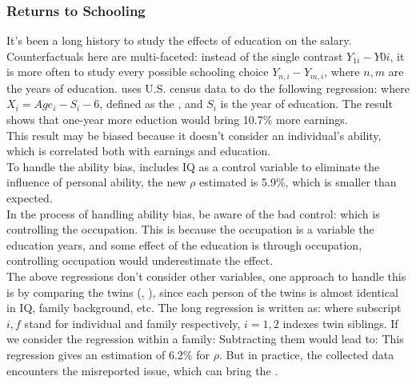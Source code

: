 \documentclass[12pt]{report}
\begin{document}
\subsubsection{Returns to Schooling}
It's been a long history to study the effects of education on the salary. Counterfactuals here are multi-faceted: instead of the
single contrast $Y_{1i}-Y{0i}$, it is more often to study every possible schooling choice $Y_{n,i}-Y_{m,i}$, where $n,m$ are the
years of education.
\cite{mincer1974schooling} uses U.S. census data to do the following regression:
where $X_i=Age_i-S_i-6$, defined as the , and $S_i$ is the year of education. The result shows that one-year more eduction would bring 10.7\% more earnings.\\
This result may be biased because it doesn't consider an individual's ability, which is correlated both with earnings and education.\\
To handle the ability bias, \cite{griliches1977estimating} includes IQ as a control variable to eliminate the influence of personal
ability, the new $\rho$ estimated is 5.9\%, which is smaller than expected.\\
In the process of handling ability bias, be aware of the bad control: which is controlling the occupation. This is because the occupation
is a variable  the education years, and some effect of the education is through occupation, controlling occupation would
underestimate the effect. \\
The above regressions don't consider other variables, one approach to handle this is by comparing the twins
(\cite{ashenfelter1994estimates}, \cite{ashenfelter1998income}), since each person of the twins is almost identical in IQ,
family background, etc. The long regression is written as:
where subscript $i,f$ stand for individual and family respectively, $i=1,2$ indexes twin siblings. If we consider the regression within a family:
Subtracting them would lead to:
This regression gives an estimation of 6.2\% for $\rho$. But in practice, the collected data encounters the misreported issue, which can bring the .
\end{document}
